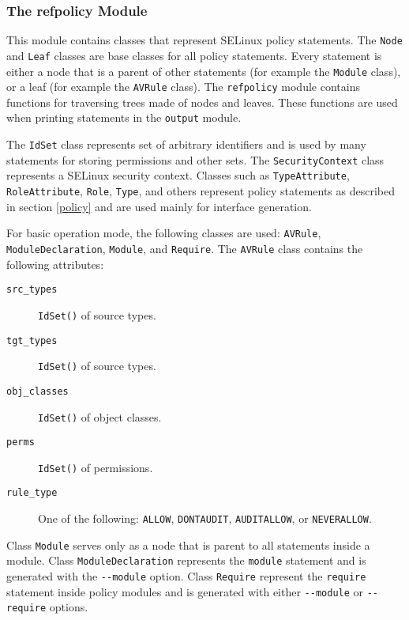 \subsubsection{The refpolicy Module}
This module contains classes that represent SELinux policy statements. The
\texttt{Node} and \texttt{Leaf} classes are base classes for all policy
statements. Every statement is either a node that is a parent of other
statements (for example the \texttt{Module} class), or a leaf (for example the
\texttt{AVRule} class). The \texttt{refpolicy} module contains functions for
traversing trees made of nodes and leaves. These functions are used when
printing statements in the \texttt{output} module.

The \texttt{IdSet} class represents set of arbitrary identifiers and is used by
many statements for storing permissions and other sets. The
\texttt{SecurityContext} class represents a SELinux security context. Classes
such as \texttt{TypeAttribute}, \texttt{RoleAttribute}, \texttt{Role},
\texttt{Type}, and others represent policy statements as described in section
\ref{policy} and are used mainly for interface generation.

For basic operation mode, the following classes are used: \texttt{AVRule},
\texttt{ModuleDeclaration}, \texttt{Module}, and \texttt{Require}. The
\texttt{AVRule} class contains the following attributes:
\begin{description}
    \item [\texttt{src\_types}] \texttt{IdSet()} of source types.
    \item [\texttt{tgt\_types}] \texttt{IdSet()} of source types.
    \item [\texttt{obj\_classes}] \texttt{IdSet()} of object classes.
    \item [\texttt{perms}] \texttt{IdSet()} of permissions.
    \item [\texttt{rule\_type}] One of the following: \texttt{ALLOW},
        \texttt{DONTAUDIT}, \texttt{AUDITALLOW}, or \texttt{NEVERALLOW}.
\end{description}
Class \texttt{Module} serves only as a node that is parent to all statements
inside a module. Class \texttt{ModuleDeclaration} represents the
\texttt{module} statement and is generated with the \texttt{-{}-module} option.
Class \texttt{Require} represent the \texttt{require} statement inside policy
modules and is generated with either \texttt{-{}-module} or \texttt{-{}-require}
options.


